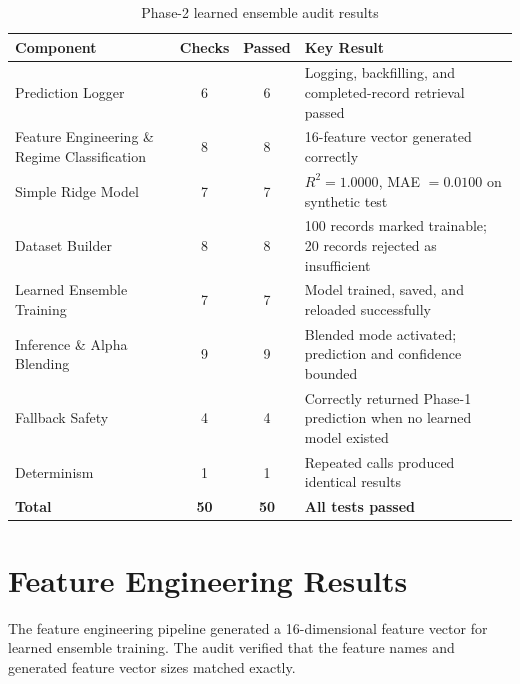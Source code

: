 \documentclass[12pt,a4paper]{report}
\begin{document}
\begin{table}[H]
\centering
\caption{Phase-2 learned ensemble audit results}
\label{tab:phase2_audit}
\begin{tabular}{|p{5cm}|c|c|p{5cm}|}
\hline
\textbf{Component} & \textbf{Checks} & \textbf{Passed} & \textbf{Key Result} \\
\hline
Prediction Logger & 6 & 6 & Logging, backfilling, and completed-record retrieval passed \\
\hline
Feature Engineering \& Regime Classification & 8 & 8 & 16-feature vector generated correctly \\
\hline
Simple Ridge Model & 7 & 7 & $R^2 = 1.0000$, MAE $= 0.0100$ on synthetic test \\
\hline
Dataset Builder & 8 & 8 & 100 records marked trainable; 20 records rejected as insufficient \\
\hline
Learned Ensemble Training & 7 & 7 & Model trained, saved, and reloaded successfully \\
\hline
Inference \& Alpha Blending & 9 & 9 & Blended mode activated; prediction and confidence bounded \\
\hline
Fallback Safety & 4 & 4 & Correctly returned Phase-1 prediction when no learned model existed \\
\hline
Determinism & 1 & 1 & Repeated calls produced identical results \\
\hline
\textbf{Total} & \textbf{50} & \textbf{50} & \textbf{All tests passed} \\
\hline
\end{tabular}
\end{table}

\section{Feature Engineering Results}

The feature engineering pipeline generated a 16-dimensional feature vector for learned ensemble training. The audit verified that the feature names and generated feature vector sizes matched exactly.
\end{document}
